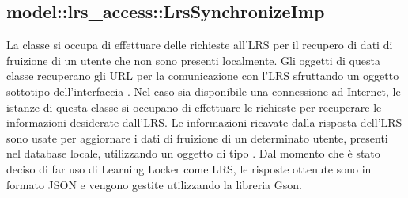 \documentclass[../Tesi.tex]{subfiles}
\begin{document}
		\subsection{model::lrs\_access::LrsSynchronizeImp}
		La classe  si occupa di effettuare delle richieste all'LRS per 
		il recupero di dati di fruizione di un utente che non sono presenti localmente. Gli oggetti di questa classe recuperano gli URL per la comunicazione con l'LRS sfruttando un oggetto sottotipo dell'interfaccia . Nel caso sia disponibile una connessione ad Internet, le istanze di questa classe si occupano di effettuare le richieste per recuperare le informazioni desiderate dall'LRS. Le informazioni ricavate dalla risposta dell'LRS sono usate per aggiornare i dati di fruizione di un determinato utente, presenti nel database locale, utilizzando un oggetto di tipo . Dal momento che è stato deciso di far uso di Learning Locker come LRS, le risposte ottenute sono in formato JSON e vengono gestite utilizzando la libreria Gson.
\end{document}
